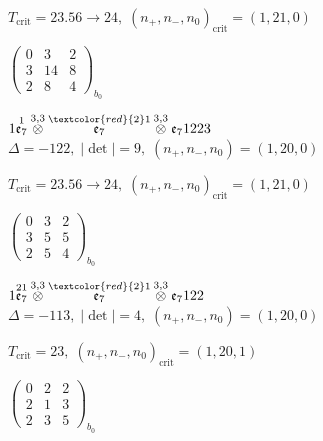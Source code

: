 \documentclass[10pt]{article}
\begin{document}
\hspace{1em}$T_{\text{crit}}=23.56 \to 24,\; (n_+,n_-,n_0)_{\text{crit}}=(1,21,0)$

\hspace{2em}$\left(\begin{smallmatrix}0 & 3 & 2 \\ 3 & 14 & 8 \\ 2 & 8 & 4\end{smallmatrix}\right)_{\!b_0}$

\smallskip

$1\overset{1}{\mathfrak{e}_7}\overset{3,3}{\otimes}\overset{\textcolor{red}{2}1}{\mathfrak{e}_7}\overset{3,3}{\otimes}\mathfrak{e}_71223$ \quad $\Delta=-122,\; |\det|=9,\; (n_+,n_-,n_0)=(1,20,0)$

\hspace{1em}$T_{\text{crit}}=23.56 \to 24,\; (n_+,n_-,n_0)_{\text{crit}}=(1,21,0)$

\hspace{2em}$\left(\begin{smallmatrix}0 & 3 & 2 \\ 3 & 5 & 5 \\ 2 & 5 & 4\end{smallmatrix}\right)_{\!b_0}$

\smallskip

$1\overset{21}{\mathfrak{e}_7}\overset{3,3}{\otimes}\overset{\textcolor{red}{2}1}{\mathfrak{e}_7}\overset{3,3}{\otimes}\mathfrak{e}_7122$ \quad $\Delta=-113,\; |\det|=4,\; (n_+,n_-,n_0)=(1,20,0)$

\hspace{1em}$T_{\text{crit}}=23,\; (n_+,n_-,n_0)_{\text{crit}}=(1,20,1)$

\hspace{2em}$\left(\begin{smallmatrix}0 & 2 & 2 \\ 2 & 1 & 3 \\ 2 & 3 & 5\end{smallmatrix}\right)_{\!b_0}$

\smallskip
\end{document}
